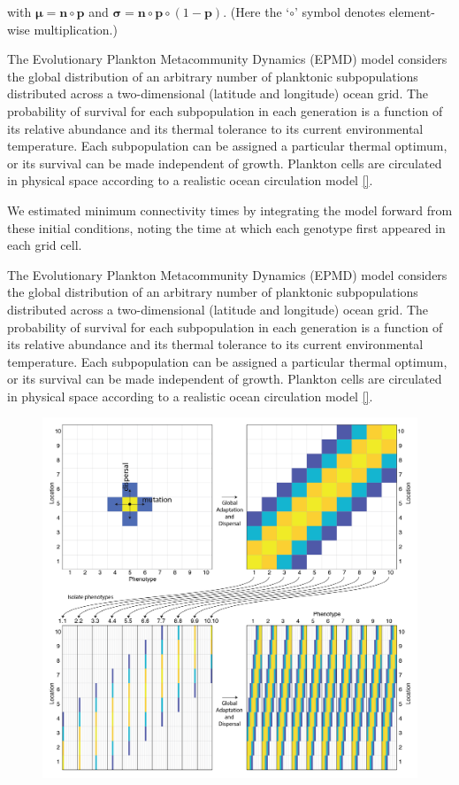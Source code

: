 \documentclass[12pt]{article}
\begin{document}
with $\boldsymbol{\mu}=\mathbf{n}\circ\mathbf{p}$ and $\boldsymbol{\sigma}=\mathbf{n}\circ\mathbf{p}\circ(1-\mathbf{p})$. (Here the `$\circ$' symbol denotes element-wise multiplication.)




The Evolutionary Plankton Metacommunity Dynamics (EPMD) model considers the global distribution of an arbitrary number of planktonic subpopulations distributed across a two-dimensional (latitude and longitude) ocean grid. The probability of survival for each subpopulation in each generation is a function of its relative abundance and its thermal tolerance to its current environmental temperature. Each subpopulation can be assigned a particular thermal optimum, or its survival can be made independent of growth. Plankton cells are circulated in physical space according to a realistic ocean circulation model \ref{}. 



We estimated minimum connectivity times by integrating the model forward from these initial conditions, noting the time at which each genotype first appeared in each grid cell. 

The Evolutionary Plankton Metacommunity Dynamics (EPMD) model considers the global distribution of an arbitrary number of  planktonic subpopulations distributed across a two-dimensional (latitude and longitude) ocean grid. The probability of survival for each subpopulation in each generation is a function of its relative abundance and its thermal tolerance to its current environmental temperature. Each subpopulation can be assigned a particular thermal optimum, or its survival can be made independent of growth. Plankton cells are circulated in physical space according to a realistic ocean circulation model \ref{}. 


\begin{figure}[htp!]
\centering
\includegraphics[width=0.8\linewidth]{../Figures/Schematic.png}
\caption{}
\label{Schematic}
\end{figure}
\end{document}
